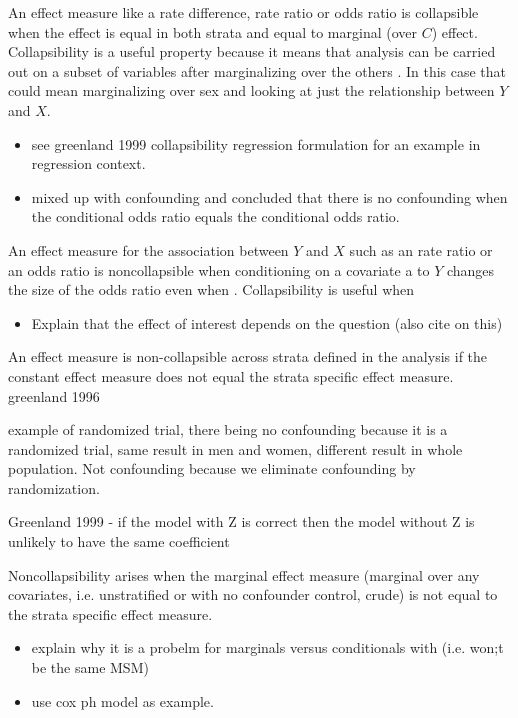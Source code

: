\documentclass[11pt]{article}
\providecommand{\tightlist}{%
      \setlength{\itemsep}{0pt}\setlength{\parskip}{0pt}}
\begin{document}
An effect measure like a rate difference, rate ratio or odds ratio is
collapsible when the effect is equal in both strata and equal to
marginal (over \(C\)) effect. Collapsibility is a useful property
because it means that analysis can be carried out on a subset of
variables after marginalizing over the others . In this case that could
mean marginalizing over sex and looking at just the relationship between
\(Y\) and \(X\). \linebreak  

\begin{itemize}
\tightlist
\item
  see greenland 1999 collapsibility regression formulation for an
  example in regression context.
\item
  mixed up with confounding and concluded that there is no confounding
  when the conditional odds ratio equals the conditional odds ratio.
\end{itemize}

An effect measure for the association between \(Y\) and \(X\) such as an
rate ratio or an odds ratio is noncollapsible when conditioning on a
covariate a to \(Y\) changes the size of the odds ratio even when .
Collapsibility is useful when

\begin{itemize}
\tightlist
\item
  Explain that the effect of interest depends on the question (also cite
  \citet{Pearl2014} on this)
\end{itemize}

An effect measure is non-collapsible across strata defined in the
analysis if the constant effect measure does not equal the strata
specific effect measure. greenland 1996

example of randomized trial, there being no confounding because it is a
randomized trial, same result in men and women, different result in
whole population. Not confounding because we eliminate confounding by
randomization.

Greenland 1999 - if the model with Z is correct then the model without Z
is unlikely to have the same coefficient

Noncollapsibility arises when the marginal effect measure (marginal over
any covariates, i.e. unstratified or with no confounder control, crude)
is not equal to the strata specific effect measure.

\begin{itemize}
\tightlist
\item
  explain why it is a probelm for marginals versus conditionals with
  (i.e. won;t be the same MSM)
\item
  use cox ph model as example.
\end{itemize}
\end{document}

